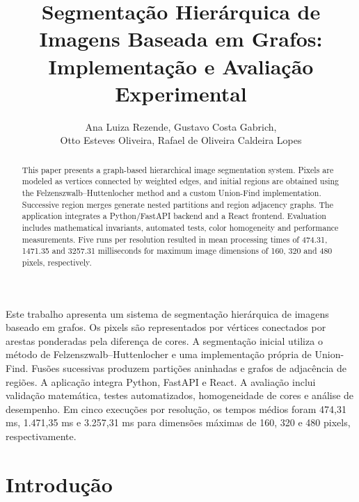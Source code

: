 \documentclass[12pt]{article}
\title{
Segmentação Hierárquica de Imagens Baseada em Grafos:
Implementação e Avaliação Experimental
}
\author{
Ana Luiza Rezende\inst{1},
Gustavo Costa Gabrich\inst{1},\\
Otto Esteves Oliveira\inst{1},
Rafael de Oliveira Caldeira Lopes\inst{1}
}
\begin{document}
\maketitle


\begin{abstract}
This paper presents a graph-based hierarchical image
segmentation system. Pixels are modeled as vertices connected
by weighted edges, and initial regions are obtained using
the Felzenszwalb--Huttenlocher method and a custom Union-Find
implementation. Successive region merges generate nested
partitions and region adjacency graphs. The application
integrates a Python/FastAPI backend and a React frontend.
Evaluation includes mathematical invariants, automated tests,
color homogeneity and performance measurements.
Five runs per resolution resulted in mean processing times
of 474.31, 1471.35 and 3257.31 milliseconds for maximum
image dimensions of 160, 320 and 480 pixels, respectively.
\end{abstract}


\begin{resumo}
Este trabalho apresenta um sistema de segmentação hierárquica
de imagens baseado em grafos. Os pixels são representados
por vértices conectados por arestas ponderadas pela diferença
de cores. A segmentação inicial utiliza o método de
Felzenszwalb--Huttenlocher e uma implementação própria de
Union-Find. Fusões sucessivas produzem partições aninhadas
e grafos de adjacência de regiões. A aplicação integra
Python, FastAPI e React. A avaliação inclui validação
matemática, testes automatizados, homogeneidade de cores
e análise de desempenho. Em cinco execuções por resolução,
os tempos médios foram 474,31 ms, 1.471,35 ms e
3.257,31 ms para dimensões máximas de 160, 320 e
480 pixels, respectivamente.
\end{resumo}

\section{Introdução}
\label{sec:introducao}
\end{document}
